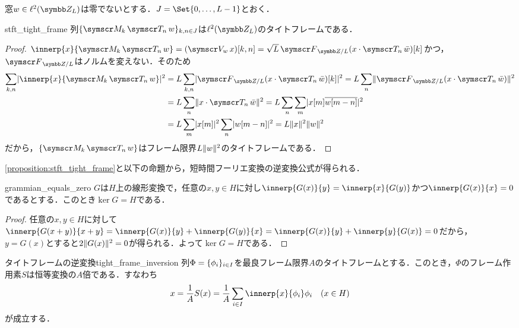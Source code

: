 \documentclass[../../main]{subfiles}
\begin{document}
窓\(w\in\cycles{L}\)は零でないとする．\(J=\Set{0,\dots,L-1}\)とおく．

\begin{proposition}{}{stft_tight_frame}
  列\(\seq{\modulate{k}\translate{n}w}_{k,n\in J}\)は\(\cycles{L}\)のタイトフレームである．
\end{proposition}

\begin{proof}
  \(\innerp{x}{\modulate{k}\translate{n}w}=(\stft{w}x)[k,n]=\sqrt{L}\dft{L}(x\cdot\translate{n}\conj{w})[k]\)かつ，\(\dft{L}\)はノルムを変えない．そのため
  \begin{align*}
    \sum_{k,n}\abs{\innerp{x}{\modulate{k}\translate{n}w}}^2 &= L\sum_{k,n}\abs{\dft{L}(x\cdot\translate{n}\conj{w})[k]}^2
    = L\sum_n\vnorm{\dft{L}(x\cdot\translate{n}\conj{w})}^2 \\
    &= L\sum_n\vnorm{x\cdot\translate{n}\conj{w}}^2
    = L\sum_n\sum_m\abs{x[m]\conj*{w[m-n]}}^2 \\
    &= L\sum_m\abs{x[m]}^2\sum_n\abs{w[m-n]}^2
    = L\vnorm{x}^2\vnorm{w}^2
  \end{align*}
  だから，\(\seq{\modulate{k}\translate{n}w}\)はフレーム限界\(L\lVert w\rVert^2\)のタイトフレームである．
\end{proof}

\cref{proposition:stft_tight_frame}と以下の命題から，短時間フーリエ変換の逆変換公式が得られる．

\begin{lemma}{}{grammian_equals_zero}
  \(G\)は\(H\)上の線形変換で，任意の\(x,y\in H\)に対し\(\innerp{G(x)}{y}=\innerp{x}{G(y)}\)かつ\(\innerp{G(x)}{x}=0\)であるとする．このとき\(\ker G=H\)である．
\end{lemma}

\begin{proof}
  任意の\(x,y\in H\)に対して\(\innerp{G(x+y)}{x+y}=\innerp{G(x)}{y}+\innerp{G(y)}{x}=\innerp{G(x)}{y}+\innerp{y}{G(x)}=0\)だから，
  \(y=G(x)\)とすると\(2\lVert G(x)\rVert^2=0\)が得られる．よって\(\ker G=H\)である．
\end{proof}

\begin{proposition}{タイトフレームの逆変換}{tight_frame_inversion}
  列\(\Phi=\lbrace\phi_i\rbrace_{i\in I}\)を最良フレーム限界\(A\)のタイトフレームとする．このとき，\(\Phi\)のフレーム作用素\(S\)は恒等変換の\(A\)倍である．すなわち
  \[
    x = \frac{1}{A}S(x)
    = \frac{1}{A}\sum_{i\in I}\innerp{x}{\phi_i}\phi_i\quad(x\in H)
  \]
  が成立する．
\end{proposition}
\end{document}
